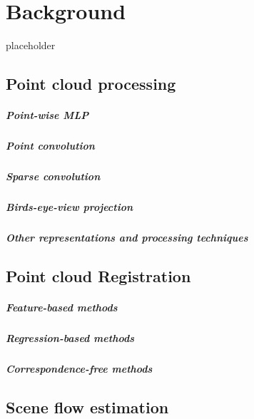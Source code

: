 
\chapter{Background}
\label{chap:background}

placeholder

\section{Point cloud processing}
\paragraph{Point-wise MLP}
\paragraph{Point convolution}
\paragraph{Sparse convolution}
\paragraph{Birds-eye-view projection}
\paragraph{Other representations and processing techniques}

\section{Point cloud Registration}
\paragraph{Feature-based methods}
\paragraph{Regression-based methods}
\paragraph{Correspondence-free methods}

\section{Scene flow estimation}
